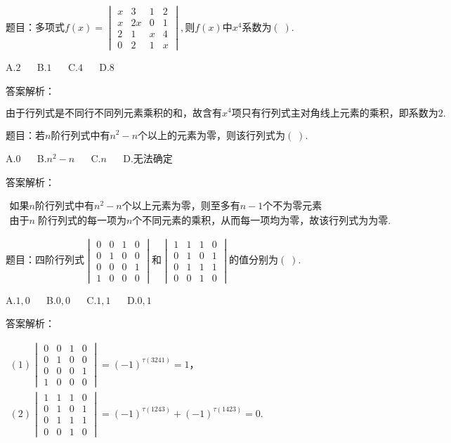 题目：$\mathrm{多项式}f(x)=\begin{vmatrix}x&3&1&2\\x&2x&0&1\\2&1&x&4\\0&2&1&x\end{vmatrix},则f(x)中x^4\mathrm{系数为}(\;).$

A.$2$ $\quad$ B.$1$ $\quad$ C.$4$ $\quad$ D.$8$

答案解析：

$\mathrm{由于行列式是不同行不同列元素乘积的和}，\mathrm{故含有}x^4\mathrm{项只有行列式主对角线上元素的乘积}，\mathrm{即系数为}2.$



题目：$若n\mathrm{阶行列式中有}n^2-n\mathrm{个以上的元素为零}，\mathrm{则该行列式为}(\;).$

A.$0$ $\quad$ B.$n^2-n$ $\quad$ C.$n$ $\quad$ D.$\mathrm{无法确定}$

答案解析：

$\begin{array}{l}\mathrm{如果}n\mathrm{阶行列式中有}n^2-n\mathrm{个以上元素为零}，\mathrm{则至多有}n-1\mathrm{个不为零元素}\\\mathrm{由于}n\;\mathrm{阶行列式的每一项为}n\mathrm{个不同元素的乘积}，\mathrm{从而每一项均为零}，\mathrm{故该行列式为为零}.\end{array}$



题目：$\mathrm{四阶行列式}\begin{vmatrix}0&0&1&0\\0&1&0&0\\0&0&0&1\\1&0&0&0\end{vmatrix}和\begin{vmatrix}1&1&1&0\\0&1&0&1\\0&1&1&1\\0&0&1&0\end{vmatrix}\mathrm{的值分别为}(\;).$

A.$1,0$ $\quad$ B.$0,0$ $\quad$ C.$1,1$ $\quad$ D.$0,1$

答案解析：

$\begin{array}{l}(1)\begin{vmatrix}0&0&1&0\\0&1&0&0\\0&0&0&1\\1&0&0&0\end{vmatrix}=(-1)^{\tau(3241)}=1，\\(2)\begin{vmatrix}1&1&1&0\\0&1&0&1\\0&1&1&1\\0&0&1&0\end{vmatrix}=(-1)^{\tau(1243)}+(-1)^{\tau(1423)}=0.\end{array}$



